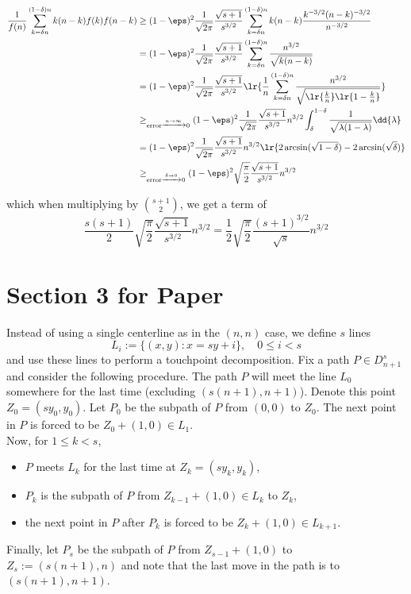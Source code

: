 \documentclass[12pt]{article}
\begin{document}
\begin{align*}
  \frac{1}{f(n)}\sum_{k=\delta n}^{(1-\delta)n} k(n-k)f(k)f(n-k) &\geq (1-\eps)^{2} \frac{1}{\sqrt{2\pi}} \frac{\sqrt{s+1}}{s^{3/2}} \sum_{k=\delta n}^{(1-\delta)n}k(n-k) \frac{k^{-3/2}(n-k)^{-3/2}}{n^{-3/2}}\\
  &= (1-\eps)^{2} \frac{1}{\sqrt{2\pi}} \frac{\sqrt{s+1}}{s^{3/2}} \sum_{k=\delta n}^{(1-\delta)n}\frac{n^{3/2}}{\sqrt{k(n-k)}}\\
  &= (1-\eps)^{2} \frac{1}{\sqrt{2\pi}} \frac{\sqrt{s+1}}{s^{3/2}}\lr{\frac{1}{n} \sum_{k=\delta n}^{(1-\delta)n}\frac{n^{3/2}}{\sqrt{\lr{\frac{k}{n}}\lr{1-\frac{k}{n}}}}}\\
  &\geq_{\text{error}\xrightarrow{n\to\infty}0} (1-\eps)^{2} \frac{1}{\sqrt{2\pi}} \frac{\sqrt{s+1}}{s^{3/2}}n^{3/2}\int_{\delta}^{1-\delta}\frac{1}{\sqrt{\lambda(1-\lambda)}}\dd{\lambda}\\
  &= (1-\eps)^{2} \frac{1}{\sqrt{2\pi}} \frac{\sqrt{s+1}}{s^{3/2}}n^{3/2}\lr{2\arcsin(\sqrt{1-\delta})-2\arcsin(\sqrt{\delta})}\\
  &\geq_{\text{error}\xrightarrow{\delta\to0}0}(1-\eps)^{2} \sqrt{\frac{\pi}{2}} \frac{\sqrt{s+1}}{s^{3/2}}n^{3/2}\\
\end{align*}

which when multiplying by $ \binom{s+1}{2} $, we get a term of
\[
  \frac{s(s+1)}{2}\sqrt{\frac{\pi}{2}}\frac{\sqrt{s+1}}{s^{3/2}}n^{3/2} = \frac{1}{2}\sqrt{\frac{\pi}{2}}\frac{(s+1)^{3/2}}{\sqrt{s}}n^{3/2}
\]


\newpage

\section*{Section 3 for Paper}

Instead of using a single centerline as in the $ (n,n) $ case, we define $ s $ lines
\[
  L_{i} := \{(x,y):x = sy+i\},\quad 0\leq i <s
\]
and use these lines to perform a touchpoint decomposition. Fix a path $ P\in D_{n+1}^{s} $ and consider the following procedure. 
The path $ P $ will meet the line $ L_{0} $ somewhere for the last time (excluding $ (s(n+1),n+1) $). Denote this point $ Z_{0} = (sy_{0},y_{0}) $. Let $ P_{0} $ be the subpath of $ P $ from $ (0,0) $ to $ Z_{0} $. The next point in $ P $ is forced to be $ Z_{0} +(1,0) \in L_{1}$. \\

\noindent Now, for $ 1\leq k <s $, 
\begin{itemize}
  \item $ P $ meets $ L_{k} $ for the last time at $ Z_{k} = (sy_{k}, y_{k}) $,
  \item $ P_{k} $ is the subpath of $ P $ from $ Z_{k-1}+(1,0)\in L_{k} $ to $ Z_{k} $,
  \item the next point in $ P $ after $ P_{k} $ is forced to be $ Z_{k}+(1,0)\in L_{k+1} $.
\end{itemize}
Finally, let $ P_{s} $ be the subpath of $ P $ from $ Z_{s-1} +(1,0)$ to $ Z_{s}:=(s(n+1), n) $ and note that the last move in the path is to $ (s(n+1), n+1) $.
\end{document}
